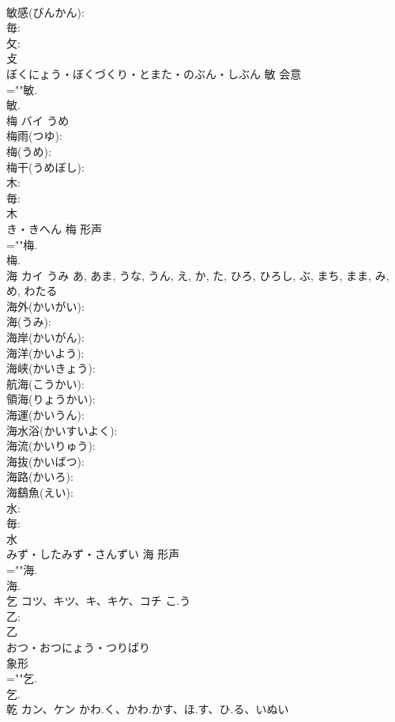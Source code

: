 \documentclass[8pt]{extreport}
\begin{document}
\begin{CJK}{UTF8}{min}
\\	敏感(びんかん): 
\\	毎: 
\\	攵: 
\\	攴	
\\	ぼくにょう・ぼくづくり・とまた・のぶん・しぶん	敏	会意 
\\	=""敏.
\\	敏.
\\	梅	バイ	うめ		
\\	梅雨(つゆ): 
\\	梅(うめ): 
\\	梅干(うめぼし): 
\\	木: 
\\	毎: 
\\	木	
\\	き・きへん	梅	形声 
\\	=""梅.
\\	梅.
\\	海	カイ	うみ	あ, あま, うな, うん, え, か, た, ひろ, ひろし, ぶ, まち, まま, み, め, わたる	
\\	海外(かいがい): 
\\	海(うみ): 
\\	海岸(かいがん): 
\\	海洋(かいよう): 
\\	海峡(かいきょう): 
\\	航海(こうかい): 
\\	領海(りょうかい): 
\\	海運(かいうん): 
\\	海水浴(かいすいよく): 
\\	海流(かいりゅう): 
\\	海抜(かいばつ): 
\\	海路(かいろ): 
\\	海鷂魚(えい): 
\\	水: 
\\	毎: 
\\	水	
\\	みず・したみず・さんずい	海	形声 
\\	=""海.
\\	海.
\\	乞	コツ、キツ、キ、キケ、コチ	こ.う		
\\	乙: 
\\	乙	
\\	おつ・おつにょう・つりばり	
\\	象形 
\\	=""乞.
\\	乞.
\\	乾	カン、ケン	かわ.く、かわ.かす、ほ.す、ひ.る、いぬい		

\end{CJK}
\end{document}

